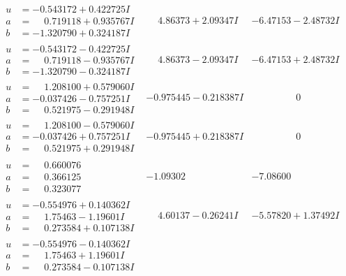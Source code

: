 \documentclass[1p]{elsarticle_modified}
\theoremstyle{definition}
\begin{document}
$$\begin{array}{c|c|c}
\begin{aligned}
u &= -0.543172 + 0.422725 I \\
a &= \phantom{-}0.719118 + 0.935767 I \\
b &= -1.320790 + 0.324187 I\end{aligned}
 & \phantom{-}4.86373 + 2.09347 I & -6.47153 - 2.48732 I \\ \hline\begin{aligned}
u &= -0.543172 - 0.422725 I \\
a &= \phantom{-}0.719118 - 0.935767 I \\
b &= -1.320790 - 0.324187 I\end{aligned}
 & \phantom{-}4.86373 - 2.09347 I & -6.47153 + 2.48732 I \\ \hline\begin{aligned}
u &= \phantom{-}1.208100 + 0.579060 I \\
a &= -0.037426 - 0.757251 I \\
b &= \phantom{-}0.521975 - 0.291948 I\end{aligned}
 & -0.975445 - 0.218387 I & \phantom{-0.000000 } 0 \\ \hline\begin{aligned}
u &= \phantom{-}1.208100 - 0.579060 I \\
a &= -0.037426 + 0.757251 I \\
b &= \phantom{-}0.521975 + 0.291948 I\end{aligned}
 & -0.975445 + 0.218387 I & \phantom{-0.000000 } 0 \\ \hline\begin{aligned}
u &= \phantom{-}0.660076\phantom{ +0.000000I} \\
a &= \phantom{-}0.366125\phantom{ +0.000000I} \\
b &= \phantom{-}0.323077\phantom{ +0.000000I}\end{aligned}
 & -1.09302\phantom{ +0.000000I} & -7.08600\phantom{ +0.000000I} \\ \hline\begin{aligned}
u &= -0.554976 + 0.140362 I \\
a &= \phantom{-}1.75463 - 1.19601 I \\
b &= \phantom{-}0.273584 + 0.107138 I\end{aligned}
 & \phantom{-}4.60137 - 0.26241 I & -5.57820 + 1.37492 I \\ \hline\begin{aligned}
u &= -0.554976 - 0.140362 I \\
a &= \phantom{-}1.75463 + 1.19601 I \\
b &= \phantom{-}0.273584 - 0.107138 I\end{aligned}

\end{array}$$
\end{document}
